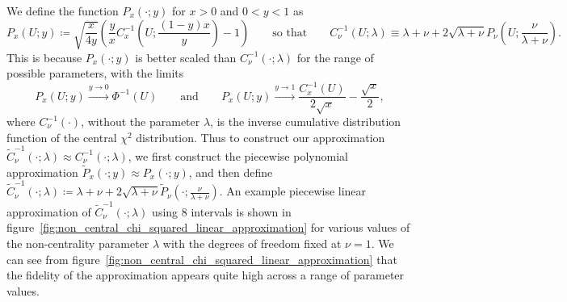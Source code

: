 \documentclass[manuscript,review]{acmart}
\begin{document}
We define the function $ P_x(\cdot;y) $ for $ x > 0 $ and $ 0 < y < 1  $ as 
\begin{equation*}
P_x(U;y) \coloneqq \sqrt{\dfrac{x}{4y}} \left( \dfrac{y}{x}  C^{-1}_{x}\left(U; \dfrac{(1 - y)x}{y}\right) - 1\right)
\qquad \text{so that} \qquad 
C^{-1}_{\nu}(U;\lambda) \equiv \lambda + \nu + 2 \sqrt{\lambda + \nu} P_\nu\left(U;\dfrac{\nu}{\lambda + \nu}\right).
\end{equation*}
This is because $ P_x(\cdot;y) $ is better scaled than $ C^{-1}_{\nu}(\cdot;\lambda) $ for the range of possible parameters, with the limits
\begin{equation*}
P_x(U;y) \xrightarrow{y\to 0} \Phi^{-1}(U) 
\qquad \text{and} \qquad 
P_x(U;y) \xrightarrow{y\to 1} \dfrac{C^{-1}_x(U)}{2\sqrt{x}} - \dfrac{\sqrt{x}}{2},
\end{equation*}
where $ C^{-1}_\nu(\cdot) $, without the parameter $ \lambda $, is the inverse cumulative distribution function of the central $ \chi^2 $ distribution. Thus to construct our approximation $ \widetilde{C}^{-1}_{\nu}(\cdot;\lambda) \approx C^{-1}_{\nu}(\cdot;\lambda) $, we first construct the piecewise polynomial approximation $ \widetilde{P}_x(\cdot;y) \approx P_x(\cdot;y) $, and then define 
$ \widetilde{C}^{-1}_{\nu}(\cdot;\lambda) \coloneqq \lambda + \nu + 2 \sqrt{\lambda + \nu} \widetilde{P}_\nu(\cdot;\tfrac{\nu}{\lambda + \nu}) $. An example piecewise linear approximation of $  \widetilde{C}^{-1}_{\nu}(\cdot;\lambda) $ using 8 intervals is shown in figure~\ref{fig:non_central_chi_squared_linear_approximation} for various values of the non-centrality parameter $ \lambda $ with the degrees of freedom fixed at $ \nu = 1 $. We can see from figure~\ref{fig:non_central_chi_squared_linear_approximation} that the fidelity of the approximation appears quite high across a range of parameter values. 
\end{document}

